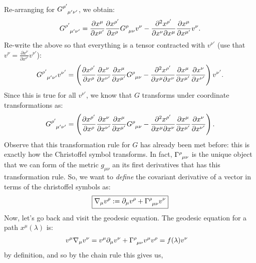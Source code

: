\documentclass[11pt]{article}
\newcommand{\grmetric}[0]{g_{\mu \nu}}
\newcommand{\christoffel}[0]{\tensor{\Gamma}{^\rho_{\mu \nu}}}
\theoremstyle{definition}
\begin{document}
Re-arranging for  \( \tensor{G}{^{\rho'}_{\mu' \nu'}} \), we obtain: 
\begin{align*}
	\tensor{G}{^{\rho'}_{\mu' \nu'}} = \frac{\partial x^{\mu}}{\partial x^{\mu'}} \frac{\partial x^{\rho'}}{\partial x^{\rho}} \tensor{G}{^\rho_{\mu \nu}} v^\nu - \frac{\partial^2 x^{\rho'}}{\partial x^\nu \partial x^\mu} \frac{\partial x^\mu}{\partial x^{\mu'}} v^\nu.
\end{align*}
Re-write the above so that everything is a tensor contracted with \( v^{\nu'} \) (use that \( v^{\nu} = \frac{\partial x^\nu}{\partial x^{\nu'}} v^{\nu'} \)): 
\begin{align*}
	\tensor{G}{^{\rho'}_{\mu' \nu'}} v^{\nu'} = \left( \frac{\partial x^{\rho'}}{\partial x^\rho } \frac{\partial x^\nu}{\partial x^{\nu'}} \frac{\partial x^\mu}{\partial x^{\mu'}} \tensor{G}{^\rho_{\mu \nu}} - \frac{\partial^2 x^{\rho'}}{\partial x^\mu \partial x^\nu} \frac{\partial x^\mu}{\partial x^{\mu'}} \frac{\partial x^\nu}{\partial x^{\nu'}} \right) v^{\nu'}.
\end{align*}
Since this is true for all \( v^{\nu'} \), we know that \( G \) transforms under coordinate transformations as: 
\begin{align*}
	\tensor{G}{^{\rho'}_{\mu' \nu'}} = \left( \frac{\partial x^{\rho'}}{\partial x^\rho } \frac{\partial x^\nu}{\partial x^{\nu'}} \frac{\partial x^\mu}{\partial x^{\mu'}} \tensor{G}{^\rho_{\mu \nu}} - \frac{\partial^2 x^{\rho'}}{\partial x^\mu \partial x^\nu} \frac{\partial x^\mu}{\partial x^{\mu'}} \frac{\partial x^\nu}{\partial x^{\nu'}} \right). 
\end{align*}
Observe that this transformation rule for \( G \) has already been met before: this is exactly how the Christoffel symbol transforms. In fact, \( \christoffel \) is the unique object that we can form of the metric \( \grmetric \) an its first derivatives that has this transformation rule. So, we want to \emph{define} the covariant derivative of a vector in terms of the christoffel symbols as: 
\begin{align}\label{def:covariantderiv} 
	\boxed{\nabla_\mu v^\rho := \partial_\mu v^\rho + \christoffel v^\nu }	
\end{align}
Now, let's go back and visit the geodesic equation. The geodesic equation for a path \( x^\mu (\lambda) \) is: 
\begin{align*}
	v^\mu \nabla_\mu v^\nu & = v^\mu \partial_\mu v^\nu + \christoffel v^\mu  v^\rho  = f(\lambda) v^\nu 
\end{align*}
by definition, and so by the chain rule this gives us, 
\end{document}
